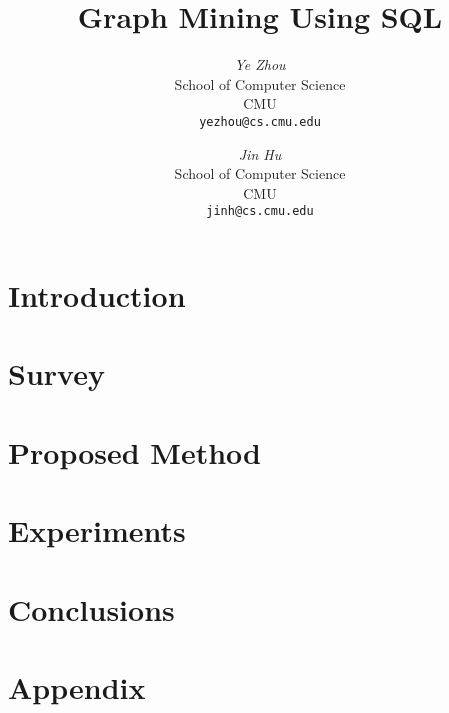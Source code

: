 \documentclass[12pt]{article}
\begin{document}
\newcommand{\beq}{\begin{equation}}
\newcommand{\eeq}{\end{equation}}
\newcommand{\bit}{\begin{itemize*}}
\newcommand{\eit}{\end{itemize*}}
\newcommand{\goal}[1]{ {\noindent {$\Rightarrow$} \em {#1} } }
\newcommand{\hide}[1]{}
\newcommand{\comment}[1]{ {\footnotesize {#1} } }
\newtheorem{lemma}{Lemma}
\newtheorem{theorem}{Theorem}
\newtheorem{proof}{Proof}
\newtheorem{defn}{Definition}
\newtheorem{algo}{Algorithm}
\newtheorem{observation}{Observation}

\title{Graph Mining Using SQL}


\author{ 
	{\em Ye Zhou} \\
	    School of Computer Science \\
	    CMU\\
	    {\tt yezhou@cs.cmu.edu}
	 \and
	 {\em Jin Hu} \\
	     School of Computer Science \\
	    CMU\\
	     {\tt jinh@cs.cmu.edu}
}


\maketitle
\begin{abstract}
    
\end{abstract}

\section{Introduction}
    \label{sec:intro}
    

\section{Survey}
    \label{sec:survey}
    

\section{Proposed Method}
    \label{sec:proposed}
    


\section{Experiments}
    \label{sec:experiments}
    

\section{Conclusions}
    \label{sec:conclusions}
    





\newpage
\appendix
\section{Appendix}


\newpage
{}
\tableofcontents
\end{document}
